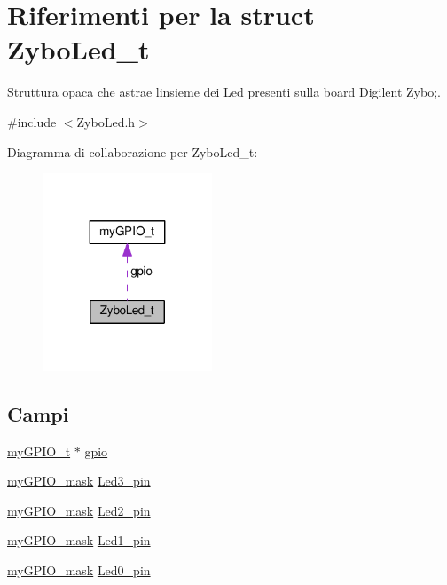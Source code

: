 \hypertarget{struct_zybo_led__t}{}\section{Riferimenti per la struct Zybo\+Led\+\_\+t}
\label{struct_zybo_led__t}


Struttura opaca che astrae l\textquotesingle{}insieme dei Led presenti sulla board Digilent Zybo;.  




{\ttfamily \#include $<$Zybo\+Led.\+h$>$}



Diagramma di collaborazione per Zybo\+Led\+\_\+t\+:\nopagebreak
\begin{figure}[H]
\begin{center}
\leavevmode
\includegraphics[width=143pt]{struct_zybo_led__t__coll__graph}
\end{center}
\end{figure}
\subsection*{Campi}
\begin{DoxyCompactItemize}
\item 
\hyperlink{structmy_g_p_i_o__t}{my\+G\+P\+I\+O\+\_\+t} $\ast$ \hyperlink{struct_zybo_led__t_ac37ddc7c58d246d233dfb38037020184}{gpio}
\item 
\hyperlink{group__bare-metal_ga402a0d20afc0cb7c25554b8b023f4253}{my\+G\+P\+I\+O\+\_\+mask} \hyperlink{struct_zybo_led__t_afc64d1407f30615e374bf9f06721842a}{Led3\+\_\+pin}
\item 
\hyperlink{group__bare-metal_ga402a0d20afc0cb7c25554b8b023f4253}{my\+G\+P\+I\+O\+\_\+mask} \hyperlink{struct_zybo_led__t_a4213c78e5a02b1476222e989c2eceb04}{Led2\+\_\+pin}
\item 
\hyperlink{group__bare-metal_ga402a0d20afc0cb7c25554b8b023f4253}{my\+G\+P\+I\+O\+\_\+mask} \hyperlink{struct_zybo_led__t_adc78fb167f1dd6693910813d4ec5930e}{Led1\+\_\+pin}
\item 
\hyperlink{group__bare-metal_ga402a0d20afc0cb7c25554b8b023f4253}{my\+G\+P\+I\+O\+\_\+mask} \hyperlink{struct_zybo_led__t_ac5afef2eef91d5533a23435cfcc60104}{Led0\+\_\+pin}
\end{DoxyCompactItemize}


